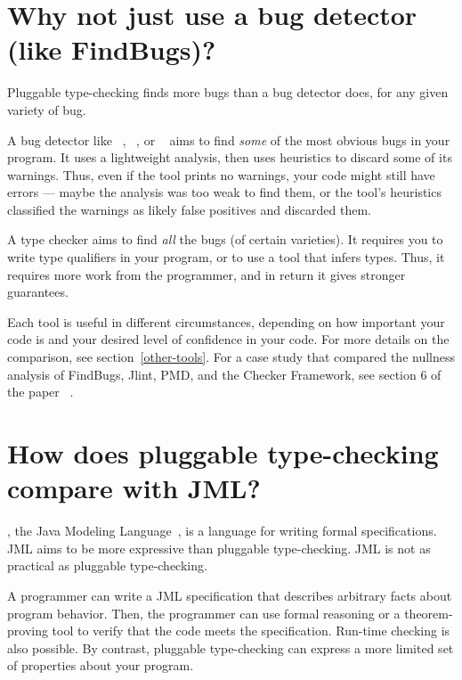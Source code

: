 \section{Why not just use a bug detector (like FindBugs)?\label{faq-type-checking-vs-bug-detectors}}

Pluggable type-checking finds more bugs than a bug detector does, for any
given variety of bug.

A bug detector like ~\cite{HovemeyerP2004,HovemeyerSP2005},
~\cite{Artho2001}, or
~\cite{Copeland2005} aims to find \emph{some}
of the most obvious bugs in your program.  It uses a lightweight analysis,
then uses heuristics to discard some of its warnings.  Thus, even if the tool
prints no warnings, your code might still have errors --- maybe the
analysis was too weak to find them, or the tool's heuristics classified the
warnings as likely false positives and discarded them.

A type checker aims to find \emph{all} the bugs (of certain varieties).
It requires you to write type qualifiers in your program, or to use a tool
that infers types.  Thus, it requires more work from the programmer, and in
return it gives stronger guarantees.

Each tool is useful in different circumstances, depending on how important
your code is and your desired level of confidence in your code.  For more
details on the comparison, see section~\ref{other-tools}.  For a case study
that compared the nullness analysis of FindBugs, Jlint, PMD, and the
Checker Framework, see section 6 of the paper
~\cite{PapiACPE2008}.


\section{How does pluggable type-checking compare with JML?\label{faq-jml}}

, the Java Modeling
Language~\cite{LeavensBR2006:JML}, is a language for writing formal
specifications.  JML aims to be more expressive than pluggable
type-checking.  JML is not as practical as pluggable type-checking.

A programmer can write a JML specification that
describes arbitrary facts about program behavior.  Then, the programmer can
use formal reasoning or a theorem-proving tool to verify that the code
meets the specification.  Run-time checking is also possible.
By contrast, pluggable type-checking can express a more limited set of
properties about your program.

